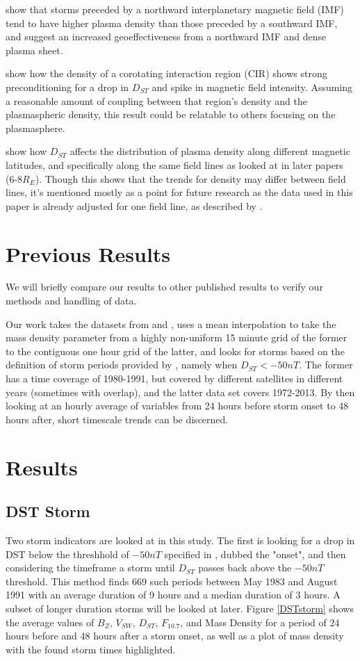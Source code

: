 \documentclass[10pt,twocolumn]{article}
\begin{document}
\cite{Lavraud2006} show that storms preceded by a northward interplanetary magnetic field (IMF) tend to have higher plasma density than those preceded by a southward IMF, and suggest an increased geoeffectiveness from a northward IMF and dense plasma sheet.

\cite{Tsurutani1997} show how the density of a corotating interaction region (CIR) shows strong preconditioning for a drop in $D_{ST}$ and spike in magnetic field intensity. Assuming a reasonable amount of coupling between that region's density and the plasmaspheric density, this result could be relatable to others focusing on the plasmasphere. 

\cite{Denton2006} show how $D_{ST}$ affects the distribution of plasma density along different magnetic latitudes, and specifically along the same field lines as looked at in later papers (6-8$R_E$). Though this shows that the trends for density may differ between field lines, it's mentioned mostly as a point for future research as the data used in this paper is already adjusted for one field line, as described by \cite{Takahashi2010}.

\section{Previous Results}
We will briefly compare our results to other published results to verify our methods and handling of data. 

Our work takes the datasets from \cite{Denton} and \cite{Reconstruction}, uses a mean interpolation to take the mass density parameter from a highly non-uniform 15 minute grid of the former to the contiguous one hour grid of the latter, and looks for storms based on the definition of storm periods provided by \cite{Takahashi2010}, namely when $D_{ST}<-50nT$. The former has a time coverage of 1980-1991, but covered by different satellites in different years (sometimes with overlap), and the latter data set covers 1972-2013. By then looking at an hourly average of variables from 24 hours before storm onset to 48 hours after, short timescale trends can be discerned. 

\section{Results}


\subsection{DST Storm}
Two storm indicators are looked at in this study. The first is looking for a drop in DST below the threshhold of $-50nT$ specified in \cite{Takahashi2010}, dubbed the "onset", and then considering the timeframe a storm until $D_{ST}$ passes back above the $-50nT$ threshold. This method finds 669 such periods between May 1983 and August 1991 with an average duration of 9 hours and a median duration of 3 hours. A subset of longer duration storms will be looked at later. Figure \ref{DSTstorm} shows the average values of $B_Z$, $V_{SW}$, $D_{ST}$, $F_{10.7}$, and Mass Density for a period of 24 hours before and 48 hours after a storm onset, as well as a plot of mass density with the found storm times highlighted.
\end{document}
